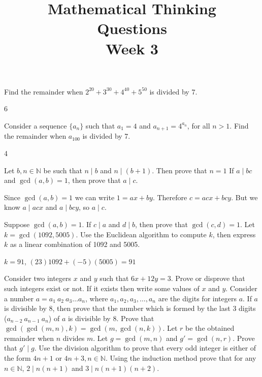 \documentclass[12pt, answers, a4paper]{exam}
\title{\begin{framed}
    \textbf{Mathematical Thinking}\\Questions\\Week 3
\end{framed}}
\date{}
\begin{document}
\maketitle
\setlength{\rightpointsmargin}{5pt}
\marginpointname{ \points}
\pointsinrightmargin
\unframedsolutions

\begin{questions}
\question[1] Find the remainder when $2^{20} + 3^{30} + 4^{40} + 5^{50}$ is divided by 7.
\begin{solution}
    6
\end{solution}
\question[2] Consider a sequence $\{a_n\}$ such that $a_1 = 4$ and $a_{n+1} = 4^{a_n}$, for all $n > 1$. Find the remainder when $a_{100}$ is divided by 7.
\begin{solution}
    4
\end{solution}
\question[1]  Let $b, n \in \mathbb{N}$ be such that $n \mid b$ and $n\mid (b+1).$ Then prove that $n=1$
\question[2]  If $a\mid bc$ and $\gcd(a,b) = 1$, then prove that $a\mid c$.
\noprintanswers
\begin{solution}
Since $\gcd(a, b) = 1$ we can write $1 = ax + by$. Therefore $c = acx + bcy$. But we know $a\mid acx$ and $a\mid bcy$, so $a\mid c$.    
\end{solution}
\question[2] Suppose $\gcd(a,b) = 1$. If $c\mid a$ and $d\mid b$, then prove that $\gcd(c,d) = 1$.
\question[3] Let $k = \gcd(1092,5005).$ Use the Euclidean algorithm to compute $k$, then express $k$ as a linear combination of 1092 and 5005.
\printanswers
\begin{solution}
    $k =91$, $(23)1092 + (-5)(5005) = 91$
\end{solution}
\question Consider two integers $x$ and $y$ such that $6x+12y=3$. Prove or disprove that such integers exist or not. If it exists then write some values of $x$ and $y$.
\question Consider a  number $a=a_1~a_2~a_3\hdots a_n$, where $a_1, a_2, a_3, \hdots , a_n$ are the digits for integers $a$. If $a$ is divisible by $8$, then prove that the number which is formed by the last 3 digits ($a_{n-2}~a_{n-1}~a_n$) of $a$ is divisible by 8.
\question Prove that $\gcd(\gcd(m, n), k)=\gcd(m, \gcd(n, k))$.
\question Let $r$ be the  obtained remainder when $n$ divides $m$. Let  $g=\gcd(m, n)$ and $g'=\gcd(n, r)$. Prove that $g'\mid g$. 
\question Use the division algorithm to prove that every odd integer is either of the form $4n+1$ or $4n+3, n \in \mathbb{N}$.
\question Using the  induction method  prove that for any $n \in \mathbb{N}$, $2\mid n(n+1)$ and $3 \mid n(n+1)(n+2)$.
\end{questions}
\end{document}
